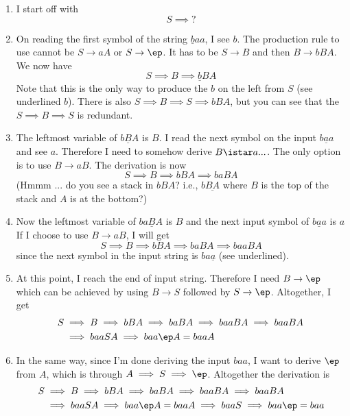 \begin{enumerate}[nosep]

\item I start off with
  \[
  S \implies ?
  \]

\item  On reading the first symbol of the string $\underline{b}aa$, I see $b$.
  The production rule to use cannot be $S \rightarrow aA$ or
  $S \rightarrow \ep$.
  It has to be $S \rightarrow B$ and then $B \rightarrow bBA$.
  We now have
  \[
  S \implies B \implies \underline{b}BA
  \]
  Note that this is the only way to produce the $b$ on the left
  from $S$
  (see underlined $b$).
  There is also $S \implies B \implies S \implies bBA$, but
  you can see that the $S \implies B \implies S$ is redundant.

\item
  The leftmost variable of $b\underline{B}A$ is $B$.
  I read the next symbol on the input $b\underline{a}a$ and see $a$.
  Therefore I need to somehow derive $B \istar a ...$.
  The only option is to use $B \rightarrow aB$.
  The derivation is now
  \[
  S \implies B \implies bBA \implies baBA
  \]
  (Hmmm ... do you see a stack in $bBA$? i.e., $b\underline{BA}$ where $B$
  is the top of the stack and $A$ is at the bottom?)
\item
  Now the leftmost variable of $ba\underline{B}A$ is $B$
  and the next input symbol
  of $b\underline{a}a$ is $a$
  If I choose to use $B \rightarrow aB$, I will get
  \[
  S \implies B \implies bBA \implies baBA \implies baaBA 
  \]
  since the next symbol in the input string is $ba\underline{a}$ (see
  underlined).
\item
  At this point, I reach the end of input string.
  Therefore I need $B \rightarrow \ep$ which can be achieved by
  using $B \rightarrow S$ followed by $S \rightarrow \ep$.
  Altogether, I get
  \begin{align*}
    S &\implies B \implies bBA \implies baBA \implies baaBA \implies baaBA \\
      &\implies baaSA \implies baa\ep A = baaA
  \end{align*}
\item
    In the same way, since I'm done deriving the input $baa$, I want to
  derive $\ep$ from $A$, which is through $A \implies S \implies \ep$.
  Altogether the derivation is
  \begin{align*}
    S &\implies B \implies bBA \implies baBA \implies baaBA \implies baaBA \\
    &\implies baaSA \implies baa\ep A = baaA \implies baaS \implies baa \ep = baa
  \end{align*}
\end{enumerate}


